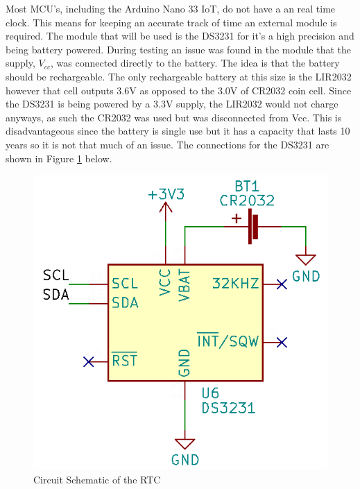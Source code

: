 \documentclass[class=report,11pt,crop=false]{standalone}
\begin{document}
	Most MCU's, including the Arduino Nano 33 IoT, do not have a an real time clock. This means for keeping an accurate track of time an external module is required. The module that will be used is the DS3231 for it’s a high precision and being battery powered. 
	During testing an issue was found in the module that the supply, $V_{cc}$, was connected directly to the battery. The idea is that the battery should be rechargeable. The only rechargeable battery at this size is the LIR2032 however that cell outputs 3.6V as opposed to the 3.0V of CR2032 coin cell. Since the DS3231 is being powered by a 3.3V supply, the LIR2032 would not charge anyways, as such the CR2032 was used but was disconnected from Vcc. This is disadvantageous since the battery is single use but it has a capacity that lasts 10 years so it is not that much of an issue. The connections for the DS3231 are shown in Figure \ref{fig:S6} below.
	\begin{figure}[h!]
		\centering
		\includegraphics[width=0.4\linewidth]{Figures/RTC.png}
		\caption{Circuit Schematic of the RTC}
		\label{fig:S6}
	\end{figure}
	\ifstandalone
	
	\printnoidxglossary[type=\acronymtype,nonumberlist]
	\fi
\end{document}
